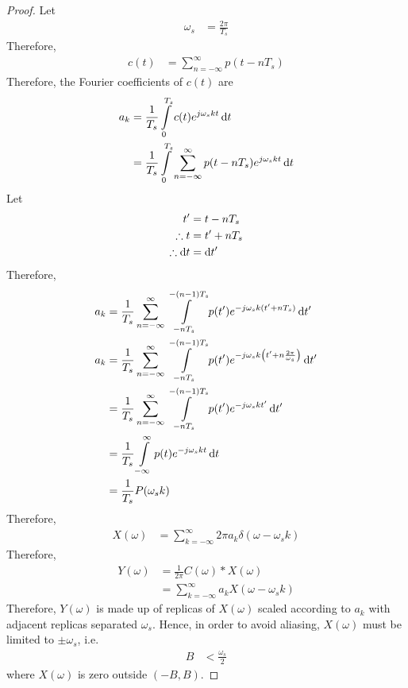 \documentclass[titlepage, fleqn, a4paper, 12pt, twoside]{article}
\theoremstyle{definition}
\theoremstyle{theorem}
\begin{document}
\begin{proof}
	Let
	\begin{align*}
		\omega_s &= \frac{2 \pi}{T_s}
	\end{align*}
	Therefore,
	\begin{align*}
		c(t) &= \sum\limits_{n = -\infty}^{\infty} p(t - n T_s)
	\end{align*}
	Therefore, the Fourier coefficients of $c(t)$ are
	\begin{align*}
		a_k &= \frac{1}{T_s} \int\limits_{0}^{T_s} c(t) e^{j \omega_s k t} \dif t\\
		&= \frac{1}{T_s} \int\limits_{0}^{T_s} \sum\limits_{n = -\infty}^{\infty} p(t - n T_s) e^{j \omega_s k t} \dif t
	\end{align*}
	Let
	\begin{align*}
		t' &= t - n T_s\\
		\therefore t &= t' + n T_s\\
		\therefore \dif t &= \dif t'
	\end{align*}
	Therefore,
	\begin{align*}
		a_k &= \frac{1}{T_s} \sum\limits_{n = -\infty}^{\infty} \int\limits_{-n T_s}^{-(n - 1) T_s} p(t') e^{-j \omega_s k (t' + n T_s)} \dif t'\\
		a_k &= \frac{1}{T_s} \sum\limits_{n = -\infty}^{\infty} \int\limits_{-n T_s}^{-(n - 1) T_s} p(t') e^{-j \omega_s k \left( t' + n \frac{2 \pi}{\omega_s} \right)} \dif t'\\
		&= \frac{1}{T_s} \sum\limits_{n = -\infty}^{\infty} \int\limits_{-n T_s}^{-(n - 1) T_s} p(t') e^{-j \omega_s k t'} \dif t'\\
		&= \frac{1}{T_s} \int\limits_{-\infty}^{\infty} p(t) e^{-j \omega_s k t} \dif t\\
		&= \frac{1}{T_s} P(\omega_s k)
	\end{align*}
	Therefore,
	\begin{align*}
		X(\omega) &= \sum\limits_{k = -\infty}^{\infty} 2 \pi a_k \delta(\omega - \omega_s k)
	\end{align*}
	Therefore,
	\begin{align*}
		Y(\omega) &= \frac{1}{2 \pi} C(\omega) \ast X(\omega)\\
		&= \sum\limits_{k = -\infty}^{\infty} a_k X(\omega - \omega_s k)
	\end{align*}
	Therefore, $Y(\omega)$ is made up of replicas of $X(\omega)$ scaled according to $a_k$ with adjacent replicas separated $\omega_s$.
	Hence, in order to avoid aliasing, $X(\omega)$ must be limited to $\pm \omega_s$, i.e.
	\begin{align*}
		B &< \frac{\omega_s}{2}
	\end{align*}
	where $X(\omega)$ is zero outside $(-B,B)$.
\end{proof}
\end{document}
